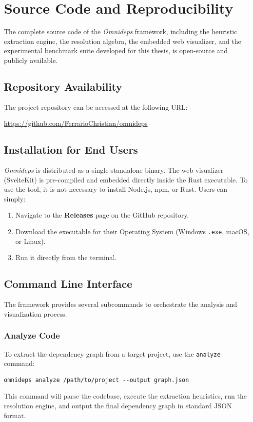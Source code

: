 \chapter{Source Code and Reproducibility}
\label{app:reproducibility}

The complete source code of the \textit{Omnideps} framework,
including the heuristic extraction engine, the resolution algebra,
the embedded web visualizer, and the experimental benchmark suite
developed for this thesis, is open-source and publicly available.

\section{Repository Availability}
The project repository can be accessed at the following URL:
\begin{center}
  \url{https://github.com/FerrarioChristian/omnideps}
\end{center}

\section{Installation for End Users}
\textit{Omnideps} is distributed as a single standalone binary. The
web visualizer (SvelteKit) is pre-compiled and embedded directly
inside the Rust executable. To use the tool, it is not necessary to
install Node.js, npm, or Rust.
Users can simply:
\begin{enumerate}
  \item Navigate to the \textbf{Releases} page on the GitHub repository.
  \item Download the executable for their Operating System (Windows
    \texttt{.exe}, macOS, or Linux).
  \item Run it directly from the terminal.
\end{enumerate}

\section{Command Line Interface}
The framework provides several subcommands to orchestrate the
analysis and visualization process.

\subsection*{Analyze Code}
To extract the dependency graph from a target project, use the
\texttt{analyze} command:
\begin{verbatim}
omnideps analyze /path/to/project --output graph.json
\end{verbatim}
This command will parse the codebase, execute the extraction
heuristics, run the resolution engine, and output the final
dependency graph in standard JSON format.

